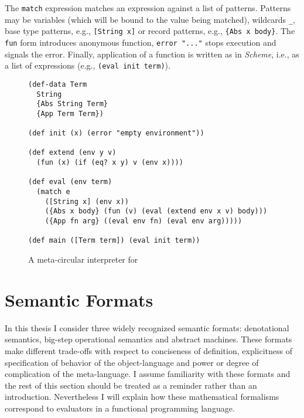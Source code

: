 The \lstinline!match! expression matches an expression against a list of patterns.
Patterns may be variables (which will be bound to the value being matched), wildcards \lstinline!_!, base type patterns, e.g., \lstinline![String x]! or record patterns, e.g., \lstinline!{Abs x body}!.
The \lstinline!fun! form introduces anonymous function, \lstinline!error "..."! stops execution and signals the error.
Finally, application of a function is written as in \textit{Scheme}, i.e., as a list of expressions (e.g., \lstinline!(eval init term)!).

\begin{figure}
    \centering
    \begin{lstlisting}
(def-data Term
  String
  {Abs String Term}
  {App Term Term})

(def init (x) (error "empty environment"))

(def extend (env y v)
  (fun (x) (if (eq? x y) v (env x))))

(def eval (env term)
  (match e
    ([String x] (env x))
    ({Abs x body} (fun (v) (eval (extend env x v) body)))
    ({App fn arg} ((eval env fn) (eval env arg)))))
        
(def main ([Term term]) (eval init term))
    \end{lstlisting}
    \caption{A meta-circular interpreter for \LC{}}
    \label{fig:lambda-calc-interp}
\end{figure}

\section{Semantic Formats}
In this thesis I consider three widely recognized semantic formats: denotational semantics, big-step operational semantics and abstract machines.
These formats make different trade-offs with respect to conciseness of definition, explicitness of specification of behavior of the object-language and power or degree of complication of the meta-language.
I assume familiarity with these formats and the rest of this section should be treated as a reminder rather than an introduction.
Nevertheless I will explain how these mathematical formalisms correspond to evaluators in a functional programming language.

